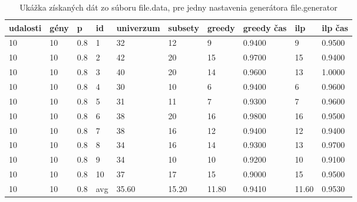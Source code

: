 \begin{table}[t]
\label{tab:vyslednedata}
\begin{center}
\begin{tabular}{llllllllll}
udalosti&gény&p&id&univerzum&subsety&greedy&greedy čas&ilp&ilp čas\\
\hline
10&10&0.8&1&32&12&9&0.9400&9&0.9500\\
10&10&0.8&2&42&20&15&0.9700&15&0.9400\\
10&10&0.8&3&40&20&14&0.9600&13&1.0000\\
10&10&0.8&4&30&10&6&0.9400&6&0.9600\\
10&10&0.8&5&31&11&7&0.9300&7&0.9600\\
10&10&0.8&6&38&20&16&0.9800&16&0.9500\\
10&10&0.8&7&38&16&12&0.9400&12&0.9400\\
10&10&0.8&8&34&16&14&0.9300&13&0.9700\\
10&10&0.8&9&34&10&10&0.9200&10&0.9100\\
10&10&0.8&10&37&17&15&0.9000&15&0.9500\\
10&10&0.8&avg&35.60&15.20&11.80&0.9410&11.60&0.9530\\
\end{tabular}
\end{center}
\caption{Ukážka získaných dát zo súboru file.data, pre jedny nastavenia generátora file.generator}
\end{table}

